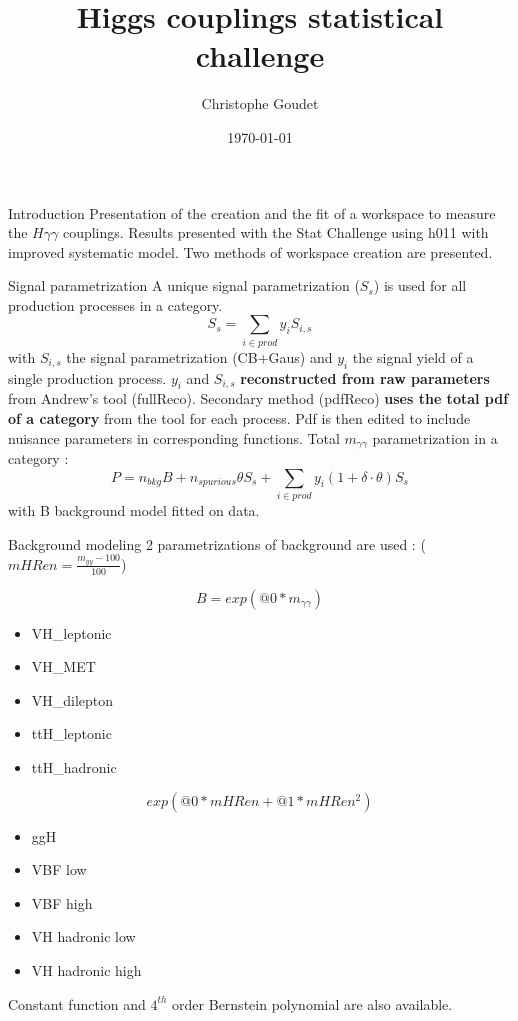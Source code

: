 \documentclass[a4paper]{beamer}
\title[$H\gamma\gamma$ couplings]{Higgs couplings statistical challenge}
\author[Goudet]{Christophe Goudet}
\institute[LAL]{\texttt{[image: /home/goudet/Hgg/ExternalPlot/LAL.jpg]} }
\date{\today}
\begin{document}
\transboxin
\begin{frame}
\maketitle
\end{frame}

%
\begin{frame}{Introduction}
Presentation of the creation and the fit of a workspace to measure the $H\gamma\gamma$ couplings.
\vfill
Results presented with the Stat Challenge using h011 with improved systematic model.
\vfill
Two methods of workspace creation are presented.
\end{frame}

\begin{frame}{Signal parametrization}
  A unique signal parametrization ($S_s$) is used for all production processes in a category.
  $$S_s = \sum\limits_{i\in prod} y_i S_{i,s}$$
  with $S_{i,s}$ the signal parametrization (CB+Gaus) and $y_i$ the signal yield of a single production process.
  $y_i$ and $S_{i,s}$ {\bf reconstructed from raw parameters} from Andrew's tool (fullReco). 
  \vfill
  Secondary method (pdfReco) {\bf uses the total pdf of a category }from the tool for each process. 
  Pdf is then edited to include nuisance parameters in corresponding functions. 
  \vfill
  Total $m_{\gamma\gamma}$ parametrization in a category :
  $$P = n_{bkg}B + n_{spurious}\theta S_s + \sum\limits_{i\in prod} y_i(1+\delta\cdot\theta) S_{s}$$
  with B background model fitted on data.

\end{frame}


\begin{frame}{Background modeling}
  2 parametrizations of background are used : ($mHRen=\frac{m_{yy}-100}{100}$)\newline
  \begin{minipage}{0.49\linewidth}
    $$B=exp(@0* m_{\gamma\gamma})$$
    \begin{itemize}
    \item VH\_leptonic
\item VH\_MET
\item VH\_dilepton
\item ttH\_leptonic
\item ttH\_hadronic
\end{itemize}
\end{minipage}
\hfill
\begin{minipage}{0.49\linewidth}
$$exp(@0*mHRen + @1*mHRen^2)$$
\begin{itemize}
\item ggH
\item VBF low
\item VBF high
\item VH hadronic low
\item VH hadronic high
\end{itemize}
\end{minipage}
\vfill
Constant function and $4^{th}$ order Bernstein polynomial are also available.
\end{frame}
\end{document}
